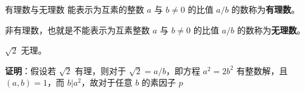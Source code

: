 
\begin{definition}{有理数与无理数}
能表示为互素的整数 $a$ 与 $b\neq 0$ 的比值 $a/b$ 的数称为\textbf{有理数}。

非有理数，也就是不能表示为互素整数 $a$ 与 $b\neq 0$ 的比值 $a/b$ 的数称为\textbf{无理数}。
\end{definition}

\begin{theorem}{}
$\sqrt{2}$ 无理。
\end{theorem}
\textbf{证明}：假设若 $\sqrt 2$ 有理，则对于 $\sqrt 2 = a/b$，即方程 $a^2=2b^2$ 有整数解，且 $(a, b) = 1$，而 $b | a^2$，故对于任意 $b$ 的素因子 $p$